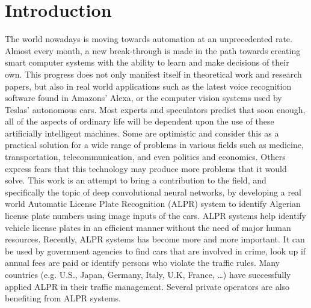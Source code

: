 \chapter*{Introduction}
\vspace{-10pt}
\enlargethispage{2\baselineskip}
The world nowadays is moving towards automation at an unprecedented rate. Almost every month, a new break-through is made in the path towards creating smart computer systems with the ability to learn and make decisions of their own. This progress does not only manifest itself in theoretical work and research papers, but also in real world applications such as the latest voice recognition software found in Amazons' Alexa, or the computer vision systems used by Teslas' autonomous cars. Most experts and speculators predict that soon enough, all of the aspects of ordinary life will be dependent upon the use of these artificially intelligent machines. Some are optimistic and consider this as a practical solution for a wide range of problems in various fields such as medicine, transportation, telecommunication, and even politics and economics. Others express fears that this technology may produce more problems that it would solve.
This work is an attempt to bring a contribution to the field, and specifically the topic of deep convolutional neural networks, by developing a real world Automatic License Plate Recognition (ALPR) system to identify Algerian license plate numbers using image inputs of the cars. ALPR systems help identify vehicle license plates in an efficient manner without the need of major human resources. Recently, ALPR systems has become more and more important. It can be used by government agencies to find cars that are involved in crime, look up if annual fees are paid or identify persons who violate the traffic rules. Many countries (e.g. U.S., Japan, Germany, Italy, U.K, France, \ldots) have successfully applied ALPR in their traffic management. Several private operators are also benefiting from ALPR systems.

